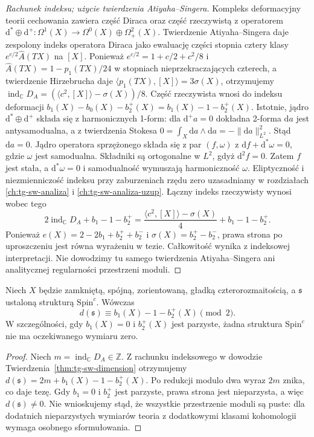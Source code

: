 \begin{proof}[Rachunek indeksu; użycie twierdzenia Atiyaha--Singera]
Kompleks deformacyjny teorii cechowania zawiera część
Diraca oraz część rzeczywistą z operatorem
$\mathrm d^*\oplus\mathrm d^+:\Omega^1(X)\to
\Omega^0(X)\oplus\Omega^2_+(X)$.
Twierdzenie Atiyaha--Singera daje zespolony indeks
operatora Diraca jako ewaluację części stopnia cztery
klasy $e^{c/2}\widehat A(TX)$ na $[X]$.
Ponieważ $e^{c/2}=1+c/2+c^2/8$ i
$\widehat A(TX)=1-p_1(TX)/24$ w stopniach
nieprzekraczających czterech, a twierdzenie Hirzebrucha
daje $\langle p_1(TX),[X]\rangle=3\sigma(X)$,
otrzymujemy
$\operatorname{ind}_{\mathbb C}D_A
=(\langle c^2,[X]\rangle-\sigma(X))/8$.
Część rzeczywista wnosi do indeksu deformacji
$b_1(X)-b_0(X)-b_2^+(X)=b_1(X)-1-b_2^+(X)$.
Istotnie, jądro $\mathrm d^*\oplus\mathrm d^+$
składa się z harmonicznych 1-form: dla
$\mathrm d^+a=0$ dokładna 2-forma $\mathrm da$
jest antysamodualna, a z twierdzenia Stokesa
$0=\int_X\mathrm da\wedge\mathrm da
=-\|\mathrm da\|_{L^2}^2$. Stąd $\mathrm da=0$.
Jądro operatora sprzężonego składa się z par
$(f,\omega)$ z $\mathrm df+\mathrm d^*\omega=0$,
gdzie $\omega$ jest samodualna. Składniki są
ortogonalne w $L^2$, gdyż $\mathrm d^2 f=0$.
Zatem $f$ jest stała, a $\mathrm d^*\omega=0$
i samodualność wymuszają harmoniczność $\omega$.
Eliptyczność i niezmienniczość indeksu przy
zaburzeniach rzędu zero uzasadniamy w rozdziałach
\ref{ch:tg-sw-analiza} i \ref{ch:tg-sw-analiza-uzup}.
Łączny indeks rzeczywisty wynosi wobec tego
\[
2\operatorname{ind}_{\mathbb C}D_A+b_1-1-b_2^+
=\frac{\langle c^2,[X]\rangle-\sigma(X)}4+b_1-1-b_2^+.
\]
Ponieważ $e(X)=2-2b_1+b_2^++b_2^-$ i
$\sigma(X)=b_2^+-b_2^-$, prawa strona po uproszczeniu
jest równa wyrażeniu w tezie.
Całkowitość wynika z indeksowej interpretacji.
Nie dowodzimy tu samego twierdzenia Atiyaha--Singera ani
analitycznej regularności przestrzeni moduli.
\end{proof}

\begin{wniosek}
\label{cor:tg-sw-index-parity}
Niech $X$ będzie zamkniętą, spójną, zorientowaną,
gładką czterorozmaitością, a $\mathfrak s$
ustaloną strukturą $\mathrm{Spin}^c$.
Wówczas
\[
d(\mathfrak s)\equiv
b_1(X)-1-b_2^+(X)\pmod2.
\]
W szczególności, gdy $b_1(X)=0$ i $b_2^+(X)$
jest parzyste, żadna struktura $\mathrm{Spin}^c$
nie ma oczekiwanego wymiaru zero.
\end{wniosek}

\begin{proof}
Niech $m=\operatorname{ind}_{\mathbb C}D_A\in\mathbb Z$.
Z rachunku indeksowego w dowodzie
Twierdzenia~\ref{thm:tg-sw-dimension}
otrzymujemy
$d(\mathfrak s)=2m+b_1(X)-1-b_2^+(X)$.
Po redukcji modulo dwa wyraz $2m$ znika,
co daje tezę. Gdy $b_1=0$ i $b_2^+$ jest
parzyste, prawa strona jest nieparzysta,
a więc $d(\mathfrak s)\ne0$.
Nie wnioskujemy stąd, że wszystkie
przestrzenie moduli są puste:
dla dodatnich nieparzystych wymiarów
teoria z dodatkowymi klasami kohomologii
wymaga osobnego sformułowania.
\end{proof}

